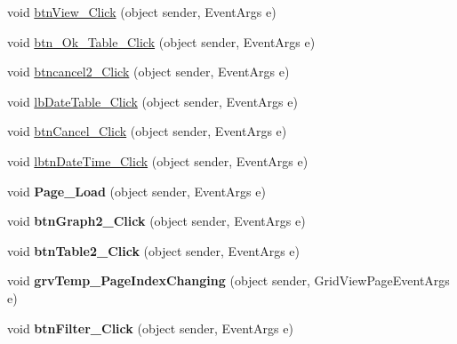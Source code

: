 \begin{DoxyCompactItemize}
\item 
void \hyperlink{classusertrackmyhealth__bodymeasurement_ae47ccc516acfc1d3235d82a599f9fb13}{btn\-View\-\_\-\-Click} (object sender, Event\-Args e)
\item 
void \hyperlink{classusertrackmyhealth__bodymeasurement_af416738243f4bda3b98c9cd16171092c}{btn\-\_\-\-Ok\-\_\-\-Table\-\_\-\-Click} (object sender, Event\-Args e)
\item 
void \hyperlink{classusertrackmyhealth__bodymeasurement_aadb7f96211a16c80b41a03f72323248d}{btncancel2\-\_\-\-Click} (object sender, Event\-Args e)
\item 
void \hyperlink{classusertrackmyhealth__bodymeasurement_ae1b1b7bca651bc9da75a752765f5337d}{lb\-Date\-Table\-\_\-\-Click} (object sender, Event\-Args e)
\item 
void \hyperlink{classusertrackmyhealth__bodymeasurement_adbe428fe5ca4fc3590503d43da70e919}{btn\-Cancel\-\_\-\-Click} (object sender, Event\-Args e)
\item 
void \hyperlink{classusertrackmyhealth__bodymeasurement_a7d9b2f1ba757b79680d81aa832b1ea53}{lbtn\-Date\-Time\-\_\-\-Click} (object sender, Event\-Args e)
\item 
\hypertarget{classusertrackmyhealth__bodymeasurement_aa7aa3928ae1b1230cc3ad2cc8e24e05b}{void {\bfseries Page\-\_\-\-Load} (object sender, Event\-Args e)}\label{classusertrackmyhealth__bodymeasurement_aa7aa3928ae1b1230cc3ad2cc8e24e05b}

\item 
\hypertarget{classusertrackmyhealth__bodymeasurement_a0f7be178c259b0f7963c753f26520305}{void {\bfseries btn\-Graph2\-\_\-\-Click} (object sender, Event\-Args e)}\label{classusertrackmyhealth__bodymeasurement_a0f7be178c259b0f7963c753f26520305}

\item 
\hypertarget{classusertrackmyhealth__bodymeasurement_a8b0019e124c30c6ba41662982ec1a89a}{void {\bfseries btn\-Table2\-\_\-\-Click} (object sender, Event\-Args e)}\label{classusertrackmyhealth__bodymeasurement_a8b0019e124c30c6ba41662982ec1a89a}

\item 
\hypertarget{classusertrackmyhealth__bodymeasurement_a8ca108cb6651d5f593b6a91920ebefb3}{void {\bfseries grv\-Temp\-\_\-\-Page\-Index\-Changing} (object sender, Grid\-View\-Page\-Event\-Args e)}\label{classusertrackmyhealth__bodymeasurement_a8ca108cb6651d5f593b6a91920ebefb3}

\item 
\hypertarget{classusertrackmyhealth__bodymeasurement_a95d53c3f78a4373f73d61ddbfdbe94b5}{void {\bfseries btn\-Filter\-\_\-\-Click} (object sender, Event\-Args e)}\label{classusertrackmyhealth__bodymeasurement_a95d53c3f78a4373f73d61ddbfdbe94b5}


\end{DoxyCompactItemize}
